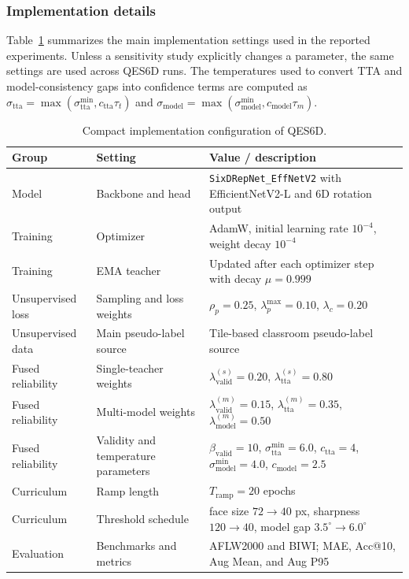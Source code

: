 \documentclass[preprint,12pt]{elsarticle}
\begin{document}
\subsubsection{Implementation details}
\label{sec:implementation_details}

Table~\ref{tab:qes6d_implementation_config} summarizes the main implementation settings used in the reported experiments. Unless a sensitivity study explicitly changes a parameter, the same settings are used across QES6D runs. The temperatures used to convert TTA and model-consistency gaps into confidence terms are computed as $\sigma_{\mathrm{tta}}=\max(\sigma_{\mathrm{tta}}^{\min},c_{\mathrm{tta}}\tau_t)$ and $\sigma_{\mathrm{model}}=\max(\sigma_{\mathrm{model}}^{\min},c_{\mathrm{model}}\tau_m)$.

\begin{table}[h]
\centering
\caption{Compact implementation configuration of QES6D.}
\label{tab:qes6d_implementation_config}
\small
\setlength{\tabcolsep}{4pt}
\begin{tabularx}{\textwidth}{p{}p{}X}
\toprule
Group & Setting & Value / description \\
\midrule
Model & Backbone and head & \texttt{SixDRepNet\_EffNetV2} with EfficientNetV2-L and 6D rotation output \\
Training & Optimizer & AdamW, initial learning rate $10^{-4}$, weight decay $10^{-4}$ \\
Training & EMA teacher & Updated after each optimizer step with decay $\mu=0.999$ \\
Unsupervised loss & Sampling and loss weights & $\rho_p=0.25$, $\lambda_p^{\max}=0.10$, $\lambda_c=0.20$ \\
Unsupervised data & Main pseudo-label source & Tile-based classroom pseudo-label source \\
Fused reliability & Single-teacher weights & $\lambda_{\mathrm{valid}}^{(s)}=0.20$, $\lambda_{\mathrm{tta}}^{(s)}=0.80$ \\
Fused reliability & Multi-model weights & $\lambda_{\mathrm{valid}}^{(m)}=0.15$, $\lambda_{\mathrm{tta}}^{(m)}=0.35$, $\lambda_{\mathrm{model}}^{(m)}=0.50$ \\
Fused reliability & Validity and temperature parameters & $\beta_{\mathrm{valid}}=10$, $\sigma_{\mathrm{tta}}^{\min}=6.0$, $c_{\mathrm{tta}}=4$, $\sigma_{\mathrm{model}}^{\min}=4.0$, $c_{\mathrm{model}}=2.5$ \\
Curriculum & Ramp length & $T_{\mathrm{ramp}}=20$ epochs \\
Curriculum & Threshold schedule & face size $72\rightarrow40$ px, sharpness $120\rightarrow40$, model gap $3.5^\circ\rightarrow6.0^\circ$ \\
Evaluation & Benchmarks and metrics & AFLW2000 and BIWI; MAE, Acc@10, Aug Mean, and Aug P95 \\
\bottomrule
\end{tabularx}
\end{table}
\end{document}
